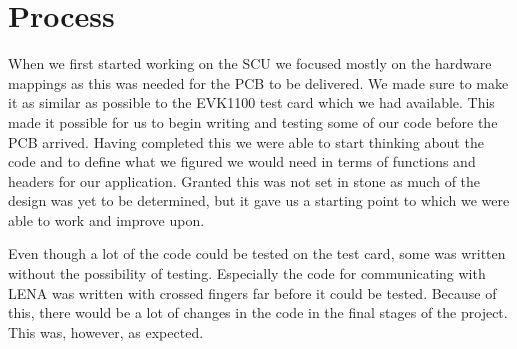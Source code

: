 \section{Process}
When we first started working on the \ac{SCU} we focused mostly on the hardware mappings as this was needed for the \ac{PCB} to be delivered. We made sure to make it as similar as possible to the EVK1100 test card which we had available. This made it possible for us to begin writing and testing some of our code before the \ac{PCB} arrived. Having completed this we were able to start thinking about the code and to define what we figured we would need in terms of functions and headers for our application. Granted this was not set in stone as much of the design was yet to be determined, but it gave us a starting point to which we were able to work and improve upon.

Even though a lot of the code could be tested on the test card, some was written without the possibility of testing. Especially the code for communicating with \ac{LENA} was written with crossed fingers far before it could be tested. Because of this, there would be a lot of changes in the code in the final stages of the project. This was, however, as expected.
